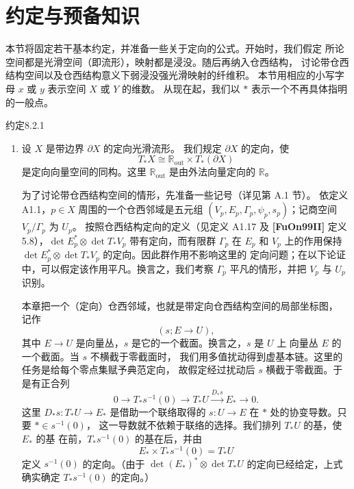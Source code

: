 
\section{约定与预备知识}
\label{sec:8-2}

本节将固定若干基本约定，并准备一些关于定向的公式。开始时，我们假定
所论空间都是光滑空间（即流形），映射都是浸没。随后再纳入仓西结构，
讨论带仓西结构空间以及仓西结构意义下弱浸没强光滑映射的纤维积。
本节用相应的小写字母 $x$ 或 $y$ 表示空间 $X$ 或 $Y$ 的维数。
从现在起，我们以 $*$ 表示一个不再具体指明的一般点。

\newpage
\begin{statement}{约定}{8.2.1}\label{conv:8-2-1}
\begin{enumerate}[label=(\arabic*),leftmargin=2.8em]
\item 设 $X$ 是带边界 $\partial X$ 的定向光滑流形。%
我们规定
$\partial X$ 的定向，使
\begin{equation}
 T_*X\cong\mathbb R_{\mathrm{out}}\times T_*(\partial X)
 \tag{8.2.1.1}\label{eq:8-2-1-1}
\end{equation}
是定向向量空间的同构。这里
$\mathbb R_{\mathrm{out}}$ 是由外法向量定向的 $\mathbb R$。

为了讨论带仓西结构空间的情形，先准备一些记号（详见第 A.1 节）。
依定义 A1.1，$p\in X$ 周围的一个仓西邻域是五元组
$(V_p,E_p,\Gamma_p,\psi_p,s_p)$；记商空间 $V_p/\Gamma_p$ 为 $U_p$。
按照仓西结构定向的定义（见定义 A1.17 及 \textbf{[FuOn99II]}
定义 5.8），$\det E_p^*\otimes\det T_*V_p$ 带有定向，而有限群
$\Gamma_p$ 在 $E_p$ 和 $V_p$ 上的作用保持
$\det E_p^*\otimes\det T_*V_p$ 的定向。因此群作用不影响这里的
定向问题；在以下论证中，可以假定该作用平凡。换言之，我们考察
$\Gamma_p$ 平凡的情形，并把 $V_p$ 与 $U_p$ 识别。

本章把一个（定向）仓西邻域，也就是带定向仓西结构空间的局部坐标图，
记作
\[
 (s;E\longrightarrow U),
\]
其中 $E\to U$ 是向量丛，$s$ 是它的一个截面。换言之，$s$ 是 $U$ 上
向量丛 $E$ 的一个截面。当 $s$ 不横截于零截面时，
我们用多值扰动得到虚基本链。这里的任务是给每个零点集赋予典范定向，
故假定经过扰动后 $s$ 横截于零截面。于是有正合列
\begin{equation}
 0\longrightarrow T_*s^{-1}(0)\longrightarrow T_*U
 \xrightarrow{D_*s}E_*\longrightarrow0.
 \tag{8.2.2}\label{eq:8-2-2}
\end{equation}
这里 $D_*s\colon T_*U\to E_*$ 是借助一个联络取得的
$s\colon U\to E$ 在 $*$ 处的协变导数。只要 $*\in s^{-1}(0)$，
这一导数就不依赖于联络的选择。我们排列 $T_*U$ 的基，使 $E_*$ 的基
在前，$T_*s^{-1}(0)$ 的基在后，并由
\[
 E_*\times T_*s^{-1}(0)=T_*U
\]
定义 $s^{-1}(0)$ 的定向。（由于
$\det(E_*)^*\otimes\det T_*U$ 的定向已经给定，上式确实确定
$T_*s^{-1}(0)$ 的定向。）


\end{enumerate}
\end{statement}
